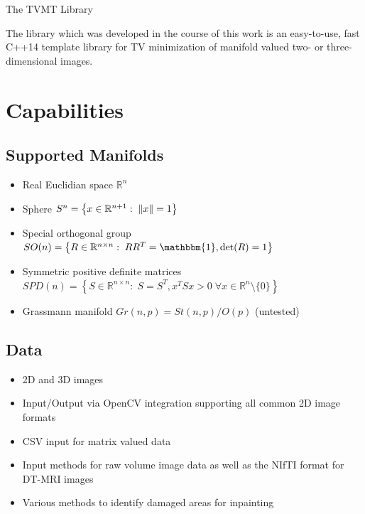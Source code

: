 \begin{chapter}{The TVMT Library}
\label{ch:library}

The library which was developed in the course of this work is an easy-to-use, fast C++14 template library for TV minimization of manifold valued two- or three-dimensional images.

\section{Capabilities} %
\label{sec:Capabilities}
\subsection{Supported Manifolds} %
\label{sub:Supported Manifolds}
\begin{itemize}
    \item Real Euclidian space $\mathbb{R}^n$
    \item Sphere $S^n=\left\lbrace x\in\mathbb{R}^{n+1}:\; \| x \|=1\right\rbrace$
    \item Special orthogonal group $SO(n)=\left\lbrace R\in\mathbb{R}^{n\times n}:\; RR^T=\mathbbm{1}, \operatorname{det}(R)=1 \right\rbrace$
    \item Symmetric positive definite matrices $SPD(n)=\left\lbrace S\in\mathbb{R}^{n\times n}:\; S=S^T, x^TSx>0\; \forall x\in\mathbb{R}^n\setminus\lbrace 0\rbrace \right\rbrace$
    \item Grassmann manifold $Gr(n,p) = St(n,p) / O(p)$ (untested)
\end{itemize}

\subsection{Data} %
\label{sub:Data}
\begin{itemize}
	\item 2D and 3D images
	\item Input/Output via OpenCV integration supporting all common 2D image formats
	\item CSV input for matrix valued data
	\item Input methods for raw volume image data as well as the NIfTI \cite{nifti} format for DT-MRI images
	\item Various methods to identify damaged areas for inpainting
\end{itemize}


\end{chapter}
